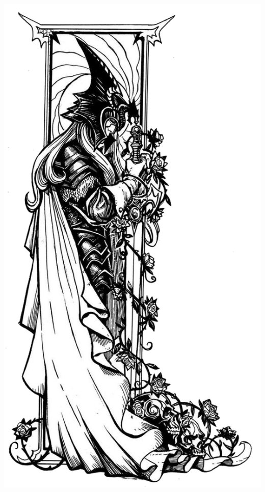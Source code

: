 \begin{multicols*}{2}


\begin{Figure}
\centering
\includegraphics[width=\textwidth]{img/elric.png}
\end{Figure}
    

\end{multicols*}
